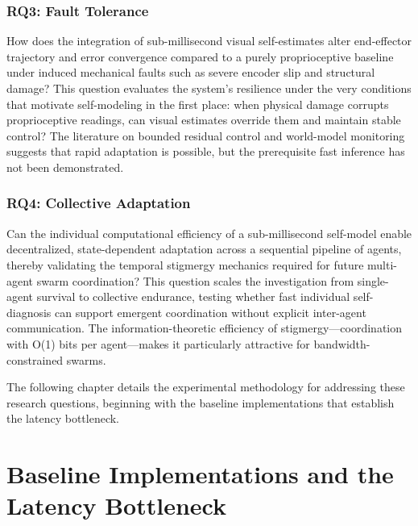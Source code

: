 \documentclass[12pt,a4paper,oneside]{report}
\begin{document}
\subsection{RQ3: Fault Tolerance}

How does the integration of sub-millisecond visual self-estimates alter end-effector trajectory and error convergence compared to a purely proprioceptive baseline under induced mechanical faults such as severe encoder slip and structural damage? This question evaluates the system's resilience under the very conditions that motivate self-modeling in the first place: when physical damage corrupts proprioceptive readings, can visual estimates override them and maintain stable control? The literature on bounded residual control and world-model monitoring suggests that rapid adaptation is possible, but the prerequisite fast inference has not been demonstrated.

\subsection{RQ4: Collective Adaptation}

Can the individual computational efficiency of a sub-millisecond self-model enable decentralized, state-dependent adaptation across a sequential pipeline of agents, thereby validating the temporal stigmergy mechanics required for future multi-agent swarm coordination? This question scales the investigation from single-agent survival to collective endurance, testing whether fast individual self-diagnosis can support emergent coordination without explicit inter-agent communication. The information-theoretic efficiency of stigmergy—coordination with O(1) bits per agent—makes it particularly attractive for bandwidth-constrained swarms.

The following chapter details the experimental methodology for addressing these research questions, beginning with the baseline implementations that establish the latency bottleneck.








\chapter{Baseline Implementations and the Latency Bottleneck}
\end{document}
